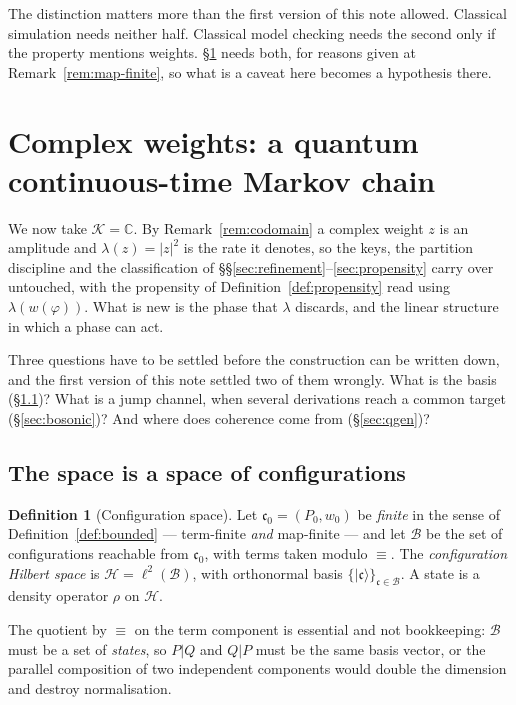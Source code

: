 \documentclass[11pt,a4paper]{article}
\theoremstyle{plain}
\theoremstyle{definition}
\newtheorem{definition}[theorem]{Definition}
\theoremstyle{remark}
\newcommand{\sepc}{\mathbin{\big|}}
\newcommand{\Cx}{\mathbb{C}}
\newcommand{\wmap}{w}
\begin{document}
The distinction matters more than the first version of this note allowed. Classical simulation needs
neither half. Classical model checking needs the second only if the property mentions weights.
\S\ref{sec:quantum} needs both, for reasons given at Remark~\ref{rem:map-finite}, so what is a
caveat here becomes a hypothesis there.

\section{Complex weights: a quantum continuous-time Markov chain}
\label{sec:quantum}

We now take $\mathcal{K} = \Cx$. By Remark~\ref{rem:codomain} a complex weight $z$ is an amplitude
and $\lambda(z) = |z|^2$ is the rate it denotes, so the keys, the partition discipline and the
classification of \S\S\ref{sec:refinement}--\ref{sec:propensity} carry over untouched, with the
propensity of Definition~\ref{def:propensity} read using $\lambda(\wmap(\varphi))$. What is new is
the phase that $\lambda$ discards, and the linear structure in which a phase can act.

Three questions have to be settled before the construction can be written down, and the first version
of this note settled two of them wrongly. What is the basis (\S\ref{sec:qspace})? What is a jump
channel, when several derivations reach a common target (\S\ref{sec:bosonic})? And where does
coherence come from (\S\ref{sec:qgen})?

\subsection{The space is a space of configurations}
\label{sec:qspace}

\begin{definition}[Configuration space]
\label{def:hilbert}
Let $\mathfrak{c}_0 = (P_0, \wmap_0)$ be \emph{finite} in the sense of Definition~\ref{def:bounded}
--- term-finite \emph{and} map-finite --- and let $\mathcal{B}$ be the set of configurations
reachable from $\mathfrak{c}_0$, with terms taken modulo $\equiv$. The \emph{configuration Hilbert
space} is $\mathcal{H} = \ell^2(\mathcal{B})$, with orthonormal basis
$\{|\mathfrak{c}\rangle\}_{\mathfrak{c} \in \mathcal{B}}$. A state is a density operator $\rho$ on
$\mathcal{H}$.
\end{definition}

The quotient by $\equiv$ on the term component is essential and not bookkeeping: $\mathcal{B}$ must
be a set of \emph{states}, so $P \sepc Q$ and $Q \sepc P$ must be the same basis vector, or the
parallel composition of two independent components would double the dimension and destroy
normalisation.
\end{document}
